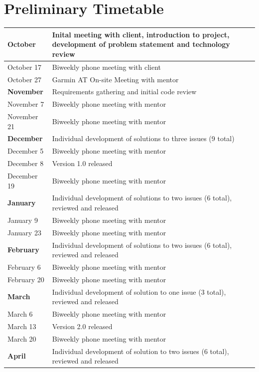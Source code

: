 \documentclass[11pt]{scrreprt}
\begin{document}
\section{Preliminary Timetable}
\begin{longtable}{| p{} | p{} |}
\hline
\textbf{October} & Inital meeting with client, introduction to project, development of problem statement and technology review\\
\hline
October 17 & Biweekly phone meeting with client\\
\hline
October 27 & Garmin AT On-site Meeting with mentor\\ 
\hline
\textbf{November} & Requirements gathering and initial code review\\
\hline
November 7 & Biweekly phone meeting with mentor\\
\hline
November 21 & Biweekly phone meeting with mentor\\
\hline
\textbf{December} & Individual development of solutions to three issues (9 total)\\
\hline
December 5 & Biweekly phone meeting with mentor\\
\hline
December 8 & Version 1.0 released\\
\hline
December 19 & Biweekly phone meeting with mentor\\
\hline
\textbf{January} & Individual development of solutions to two issues (6 total), reviewed and released\\
\hline
January 9 & Biweekly phone meeting with mentor\\
\hline
January 23 & Biweekly phone meeting with mentor\\
\hline
\textbf{February} & Individual development of solutions to two issues (6 total), reviewed and released\\
\hline
February 6 & Biweekly phone meeting with mentor\\
\hline
February 20 & Biweekly phone meeting with mentor\\
\hline
\textbf{March} & Individual development of solution to one issue (3 total), reviewed and released\\
\hline
March 6 & Biweekly phone meeting with mentor\\
\hline
March 13 & Version 2.0 released\\
\hline
March 20 & Biweekly phone meeting with mentor\\
\hline
\textbf{April} & Individual development of solution to two issues (6 total), reviewed and released\\

\end{longtable}
\end{document}
